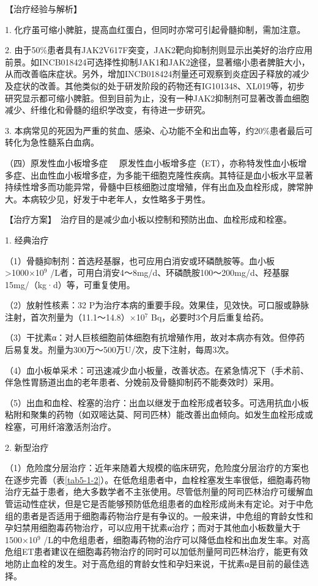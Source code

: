 【治疗经验与解析】

1. 化疗虽可缩小脾脏，提高血红蛋白，但同时亦常可引起骨髓抑制，需加注意。

2.
由于50\%患者具有JAK2V617F突变，JAK2靶向抑制剂则显示出美好的治疗应用前景。如INCB018424可选择性抑制JAK1和JAK2途径，显著缩小患者脾脏大小，从而改善临床症状。另外，增加INCB018424剂量还可观察到炎症因子释放的减少及症状的改善。其他类似的处于研发阶段的药物还有IG101348、XL019等，初步研究显示都可缩小脾脏。但到目前为止，没有一种JAK2抑制剂可显著改善血细胞减少、纤维化和骨髓的组织学改变，有待进一步研究。

3.
本病常见的死因为严重的贫血、感染、心功能不全和出血等，约20\%患者最后可转化为急性髓系白血病。

{（四）原发性血小板增多症}
　原发性血小板增多症（ET），亦称特发性血小板增多症、出血性血小板增多症，为多能干细胞克隆性疾病。其特征是血小板水平显著持续性增多而功能异常，骨髓中巨核细胞过度增殖，伴有出血及血栓形成，脾常肿大。本病较少见，好发于中老年人，女性略多于男性。

【治疗方案】　治疗目的是减少血小板以控制和预防出血、血栓形成和栓塞。

1. 经典治疗

（1）骨髓抑制剂：首选羟基脲，也可应用白消安或环磷酰胺等。血小板\textgreater{}1000×10$^{9}$
/L者，可用白消安4～8mg/d、环磷酰胺100～200mg/d、羟基脲15mg/（kg·d）等，可重复使用。

（2）放射性核素：{32}
P为治疗本病的重要手段。效果佳，见效快。可口服或静脉注射，首次剂量为（11.1～14.8）×10$^{7}$
Bq，必要时3个月后重复给药。

（3）干扰素α：对人巨核细胞前体细胞有抗增殖作用，故对本病亦有效。但停药后易复发。剂量为300万～500万U/次，皮下注射，每周3次。

（4）血小板单采术：可迅速减少血小板量，改善状态。在紧急情况下（手术前、伴急性胃肠道出血的老年患者、分娩前及骨髓抑制药不能奏效时）采用。

（5）出血和血栓、栓塞的治疗：出血以继发于血栓形成者较多。可选用抗血小板粘附和聚集的药物（如双嘧达莫、阿司匹林）能改善出血倾向。如发生血栓形成或栓塞，可用纤溶激活剂治疗。

2. 新型治疗

（1）危险度分层治疗：近年来随着大规模的临床研究，危险度分层治疗的方案也在逐步完善（表\ref{tab5-1-2}）。在低危组患者中，血栓栓塞发生率很低，细胞毒药物治疗无益于患者，绝大多数学者不主张使用。尽管低剂量的阿司匹林治疗可缓解血管运动性症状，但是它是否能够预防低危组患者的血栓形成尚未有定论。对于中危组的患者是否适用于细胞毒药物治疗是有争议的。一般来讲，中危组的育龄女性和孕妇禁用细胞毒药物治疗，可以应用干扰素α治疗；而对于其他血小板数量大于1500×10$^{9}$
/L的中危组患者，细胞毒药物的治疗可以降低血栓和出血发生率。对高危组ET患者建议在细胞毒药物治疗的同时可以加低剂量阿司匹林治疗，能更有效地防止血栓的发生。对于高危组的育龄女性和孕妇来说，干扰素α是目前的最佳选择。


